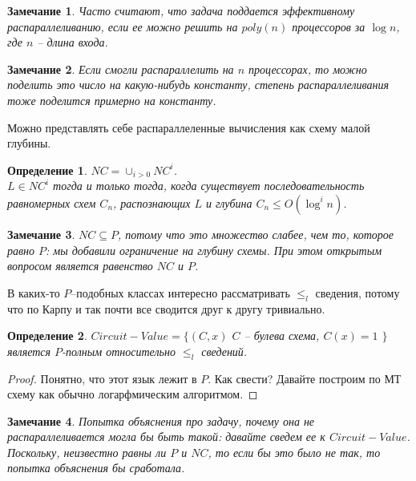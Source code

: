 \documentclass[12pt, letterpaper]{article}
\newtheorem{defi}{Определение}[section]
\newtheorem{note}{Замечание}[section]
\newcommand{\leql}{\leq_{l}}
\begin{document}
\begin{note}
Часто считают, что задача поддается эффективному распараллеливанию, если ее можно решить на $poly(n)$ процессоров за $\log n$, где $n$ -- длина входа.
\end{note}

\begin{note}
Если смогли распараллелить на $n$ процессорах, то можно поделить это число на какую-нибудь константу, степень распараллеливания тоже поделится примерно на константу.
\end{note}
Можно представлять себе распараллеленные вычисления как схему малой глубины.

\begin{defi}
$NC = \cup_{i>0} NC^i$. \\
$L \in NC^i$ тогда и только тогда, когда существует последовательность равномерных схем $C_n$, распознающих $L$ и глубина $C_n \leq O(\log^i n)$.
\end{defi}
\begin{note}
$NC \subseteq P$, потому что это множество слабее, чем то, которое равно $P$: мы добавили ограничение на глубину схемы. При этом открытым вопросом является равенство $NC$ и $P$.
\end{note}
В каких-то $P$--подобных классах интересно рассматривать $\leql$ сведения, потому что по Карпу и так почти все сводится друг к другу тривиально.

\begin{defi}
$Circuit-Value = \{(C, x)$ $C$ -- булева схема, $C(x)=1$ $\}$ является $P$-полным относительно $\leql$ сведений. 
\end{defi}
\begin{proof}
Понятно, что этот язык лежит в $P$. Как свести? Давайте построим по МТ схему как обычно логарфмическим алгоритмом.
\end{proof}

\begin{note}
Попытка объяснения про задачу, почему она не распараллеливается могла бы быть такой: давайте сведем ее к $Circuit-Value$. Поскольку, неизвестно равны ли $P$ и $NC$, то если бы это было не так, то попытка объяснения бы сработала.
\end{note}
\end{document}
